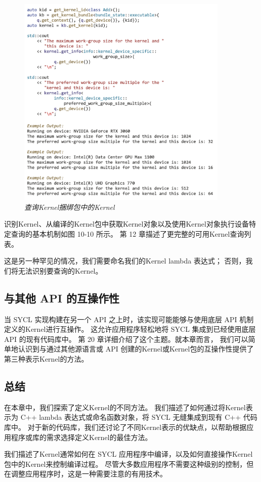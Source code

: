 \begin{figure}[H]
	\centering
	\includegraphics[width=0.9\textwidth]{figs/F10.10.png}
	\caption{\textit{查询Kernel捆绑包中的Kernel }}
\end{figure}

识别Kernel、从编译的Kernel包中获取Kernel对象以及使用Kernel对象执行设备特定查询的基本机制如图 10-10 所示。 
第 12 章描述了更完整的可用Kernel查询列表。

这是另一种罕见的情况，我们需要命名我们的Kernel lambda 表达式； 否则，我们将无法识别要查询的Kernel。

\subsection{与其他 API 的互操作性}
当 SYCL 实现构建在另一个 API 之上时，该实现可能能够与使用底层 API 机制定义的Kernel进行互操作。 
这允许应用程序轻松地将 SYCL 集成到已经使用底层 API 的现有代码库中。 
第 20 章详细介绍了这个主题。就本章而言，
我们可以简单地认识到与通过其他源语言或 API 创建的Kernel或Kernel包的互操作性提供了第三种表示Kernel的方法。

\subsection{总结}
在本章中，我们探索了定义Kernel的不同方法。 
我们描述了如何通过将Kernel表示为 C++ lambda 表达式或命名函数对象，将 SYCL 无缝集成到现有 C++ 代码库中。 
对于新的代码库，我们还讨论了不同Kernel表示的优缺点，以帮助根据应用程序或库的需求选择定义Kernel的最佳方法。

我们描述了Kernel通常如何在 SYCL 应用程序中编译，以及如何直接操作Kernel包中的Kernel来控制编译过程。 
尽管大多数应用程序不需要这种级别的控制，但在调整应用程序时，这是一种需要注意的有用技术。